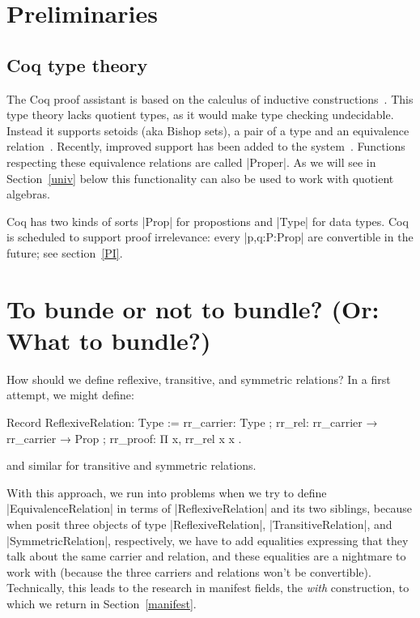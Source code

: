 \documentclass[a4paper,10pt, runningheads]{llncs}
\begin{document}
\section{Preliminaries}
\subsection{Coq type theory}
The Coq proof assistant is based on the calculus of inductive
constructions~\cite{CoquandHuet,CoquandPaulin}.
This type theory lacks quotient types, as it would make type checking undecidable. Instead it
supports setoids (aka Bishop sets), a pair of a type and an equivalence
relation~\cite{Bishop67,Hofmann,Capretta}. Recently, improved support has been added to the
system~\cite{Setoid-rewrite}. Functions respecting these equivalence relations are called |Proper|.
As we will see in Section~\ref{univ} below this functionality can also be used to work with
quotient algebras.

Coq has two kinds of sorts |Prop| for propostions and |Type| for data types. Coq
is scheduled to support proof irrelevance: every |p,q:P:Prop| are
convertible in the future; see section~\ref{PI}.


\section{To bunde or not to bundle? (Or: What to bundle?)}

How should we define reflexive, transitive, and symmetric relations? In a first attempt, we
might define:
\begin{code}
  Record ReflexiveRelation: Type :=
    { rr_carrier: Type
    ; rr_rel: rr_carrier → rr_carrier → Prop
    ; rr_proof: Π x, rr_rel x x }.
\end{code}
and similar for transitive and symmetric relations.

With this approach, we run into problems when we try to define |EquivalenceRelation| in terms of
|ReflexiveRelation| and its two siblings, because when posit three objects of type
|ReflexiveRelation|, |TransitiveRelation|, and |SymmetricRelation|, respectively, we have to
add equalities expressing that they talk about the same carrier and relation, and these equalities
are a nightmare to work with (because the three carriers and relations won't be convertible).
Technically, this leads to the research in manifest fields, the \emph{with} construction, to which
we return in Section~\ref{manifest}.
\end{document}
